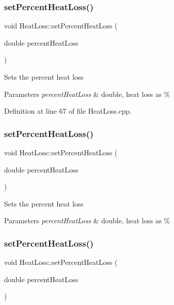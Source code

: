 \subsubsection{\texorpdfstring{set\+Percent\+Heat\+Loss()}{setPercentHeatLoss()}\hspace{0.1cm}{\footnotesize\ttfamily [1/3]}}
{\footnotesize\ttfamily void Heat\+Loss\+::set\+Percent\+Heat\+Loss (\begin{DoxyParamCaption}\item[{double}]{percent\+Heat\+Loss }\end{DoxyParamCaption})}

Sets the percent heat loss 
\begin{DoxyParams}{Parameters}
{\em percent\+Heat\+Loss} & double, heat loss as \% \\
\hline
\end{DoxyParams}


Definition at line 67 of file Heat\+Loss.\+cpp.

\mbox{\label{class_heat_loss_a2a4a80b16c1f975e194ae466b20d46bd}} 
\subsubsection{\texorpdfstring{set\+Percent\+Heat\+Loss()}{setPercentHeatLoss()}\hspace{0.1cm}{\footnotesize\ttfamily [2/3]}}
{\footnotesize\ttfamily void Heat\+Loss\+::set\+Percent\+Heat\+Loss (\begin{DoxyParamCaption}\item[{double}]{percent\+Heat\+Loss }\end{DoxyParamCaption})}

Sets the percent heat loss 
\begin{DoxyParams}{Parameters}
{\em percent\+Heat\+Loss} & double, heat loss as \% \\
\hline
\end{DoxyParams}
\mbox{\label{class_heat_loss_a2a4a80b16c1f975e194ae466b20d46bd}} 
\subsubsection{\texorpdfstring{set\+Percent\+Heat\+Loss()}{setPercentHeatLoss()}\hspace{0.1cm}{\footnotesize\ttfamily [3/3]}}
{\footnotesize\ttfamily void Heat\+Loss\+::set\+Percent\+Heat\+Loss (\begin{DoxyParamCaption}\item[{double}]{percent\+Heat\+Loss }\end{DoxyParamCaption})}

